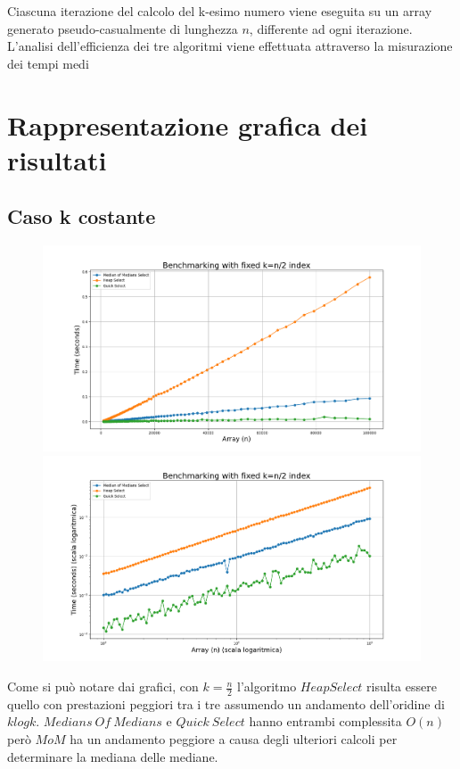 \documentclass[a4paper]{article}
\begin{document}
Ciascuna iterazione del calcolo del k-esimo numero viene eseguita su un array generato pseudo-casualmente di lunghezza \( n \), differente ad ogni iterazione.
L'analisi dell'efficienza dei tre algoritmi viene effettuata attraverso la misurazione dei tempi medi\\

\newpage
\section{Rappresentazione grafica dei risultati}
\label{sec:grafici}

\subsection{Caso k costante}
\begin{figure}[h]
            \centering
            \includegraphics[width=.83\textwidth]{graphs/k_const_n.png}
            \includegraphics[width=.83\textwidth]{graphs/k_const_2xlog.png}
\end{figure}
Come si può notare dai grafici, con $k=\frac{n}{2}$ l'algoritmo $HeapSelect$ risulta essere quello con prestazioni peggiori tra i tre assumendo un andamento dell'oridine di $klogk$.
$Medians\ Of\ Medians$ e $Quick\ Select$ hanno entrambi complessita $O(n)$ però $MoM$ ha un andamento peggiore a causa degli ulteriori calcoli per determinare la mediana delle mediane.\\
\end{document}
